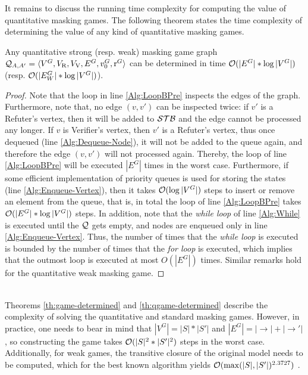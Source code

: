 It remains to discuss the running time complexity for computing the value of quantitative masking games. 
The following theorem states the time complexity of determining the value of any kind of quantitative masking games.
%
\sloppy \begin{thm}\label{th:qgame-determined} Any quantitative strong (resp. weak) masking game graph 
$\mathcal{Q}_{A, A'} = \langle V^G, V_{\mathrm{R}}, V_{\mathrm{V}}, E^G, v_0^G, \operatorname{r}^G \rangle$   can  be determined in 
time  $\mathcal{O}(|E^G|*\log |V^G|)$ (resp. $\mathcal{O}(|E_W^G|*\log |V^G|)$).
\end{thm}
\begin{proof}
	Note that the loop in line \ref{Alg:LoopBPre} inspects the edges of the graph. Furthermore, note that, no edge $(v, v')$ can be inspected twice:
	if $v'$ is a Refuter's vertex, then it will be added to $\mathcal{STB}$ and the edge cannot be processed any longer. 
	If $v$ is Verifier's vertex, then $v'$ is a Refuter's
	vertex, thus once dequeued (line \ref{Alg:Dequeue-Node}), it will not be added to the queue again, and therefore the edge  $(v, v')$ will not
	processed again. Thereby,  the loop of line \ref{Alg:LoopBPre} will be executed $|E^G|$ times in the worst case. 
	Furthermore,  if some efficient implementation of priority queues is used for storing the states (line \ref{Alg:Enqueue-Vertex}), 
	then it takes $\mathcal{O}(\log |V^G|)$ steps to insert or remove an element from the queue, that is, in total the loop of line \ref{Alg:LoopBPre} takes $\mathcal{O}(|E^G|*\log |V^G|)$ steps.
	In addition, note that the \emph{while loop} of line \ref{Alg:While} is executed until the $\mathcal{Q}$ gets empty, and nodes are enqueued only in line \ref{Alg:Enqueue-Vertex}. Thus, the number of times that the \emph{while loop} is executed is 
	bounded by the number of times that the \emph{for loop} 	is executed, which implies that
	the outmost loop is executed at most $O(|E^G|)$ times. Similar remarks hold for the quantitative weak masking game.	

\qedhere
\end{proof} \\

Theorems \ref{th:game-determined} and \ref{th:qgame-determined} describe the complexity of solving the quantitative and standard masking games. However, in practice, one needs to bear in mind that $|V^G| = |S|*|S'|$ and $|E^G| = |{\rightarrow}|+|{\rightarrow'}|$, so constructing the game takes 
$\mathcal{O}(|S|^2*|S'|^2)$ steps in the worst case. Additionally, for weak games, the transitive closure of the original model needs to be computed, which for the best known algorithm yields $\mathcal{O}(\max(|S|,|S'|)^{2.3727})$ \cite{Wil12}.


